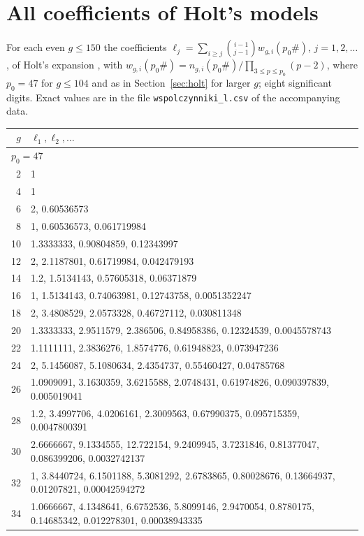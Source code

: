 \documentclass[11pt]{article}
\theoremstyle{definition}
\theoremstyle{remark}
\begin{document}
\section{All coefficients of Holt's models}\label{app:coef}
For each even $g \le 150$ the coefficients $\ell_j = \sum_{i \ge j} \binom{i-1}{j-1} w_{g,i}(p_0\#)$, $j = 1, 2, \dots$, of Holt's expansion \cite[eq.~(1.2)]{Ho26}, with $w_{g,i}(p_0\#) = n_{g,i}(p_0\#) / \prod_{3 \le p \le p_0}(p-2)$, where $p_0 = 47$ for $g \le 104$ and as in Section~\ref{sec:holt} for larger $g$; eight significant digits. Exact values are in the file \texttt{wspolczynniki\_l.csv} of the accompanying data.
{\small
\begin{longtable}{r p{}}
\toprule
$g$ & $\ell_1, \ell_2, \dots$ \\
\midrule
\endhead
\multicolumn{2}{l}{$p_0 = 47$} \\
2 & 1 \\
4 & 1 \\
6 & 2, 0.60536573 \\
8 & 1, 0.60536573, 0.061719984 \\
10 & 1.3333333, 0.90804859, 0.12343997 \\
12 & 2, 2.1187801, 0.61719984, 0.042479193 \\
14 & 1.2, 1.5134143, 0.57605318, 0.06371879 \\
16 & 1, 1.5134143, 0.74063981, 0.12743758, 0.0051352247 \\
18 & 2, 3.4808529, 2.0573328, 0.46727112, 0.030811348 \\
20 & 1.3333333, 2.9511579, 2.386506, 0.84958386, 0.12324539, 0.0045578743 \\
22 & 1.1111111, 2.3836276, 1.8574776, 0.61948823, 0.073947236 \\
24 & 2, 5.1456087, 5.1080634, 2.4354737, 0.55460427, 0.04785768 \\
26 & 1.0909091, 3.1630359, 3.6215588, 2.0748431, 0.61974826, 0.090397839, 0.005019041 \\
28 & 1.2, 3.4997706, 4.0206161, 2.3009563, 0.67990375, 0.095715359, 0.0047800391 \\
30 & 2.6666667, 9.1334555, 12.722154, 9.2409945, 3.7231846, 0.81377047, 0.086399206, 0.0032742137 \\
32 & 1, 3.8440724, 6.1501188, 5.3081292, 2.6783865, 0.80028676, 0.13664937, 0.01207821, 0.00042594272 \\
34 & 1.0666667, 4.1348641, 6.6752536, 5.8099146, 2.9470054, 0.8780175, 0.14685342, 0.012278301, 0.00038943335 \\

\end{longtable}}
\end{document}
